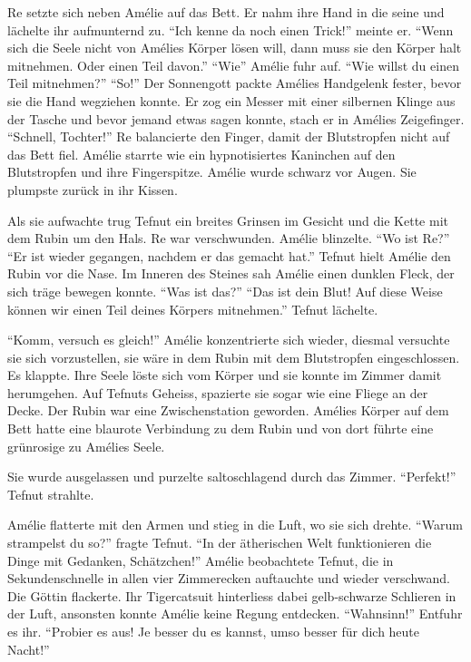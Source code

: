 \documentclass[11pt,titlepage,a5paper]{book}
\begin{document}
Re setzte sich neben Amélie auf das Bett. Er nahm ihre Hand in die seine und lächelte ihr aufmunternd zu. "`Ich kenne da noch einen Trick!"' meinte er. "`Wenn sich die Seele nicht von Amélies Körper lösen will, dann muss sie den Körper halt mitnehmen. Oder einen Teil davon."' "`Wie"' Amélie fuhr auf. "`Wie willst du einen Teil mitnehmen?"' "`So!"' Der Sonnengott packte Amélies Handgelenk fester, bevor sie die Hand wegziehen konnte. Er zog ein Messer mit einer silbernen Klinge aus der Tasche und bevor jemand etwas sagen konnte, stach er in Amélies Zeigefinger. "`Schnell, Tochter!"' Re balancierte den Finger, damit der Blutstropfen nicht auf das Bett fiel. Amélie starrte wie ein hypnotisiertes Kaninchen auf den Blutstropfen und ihre Fingerspitze. Amélie wurde schwarz vor Augen. Sie plumpste zurück in ihr Kissen. 

Als sie aufwachte trug Tefnut ein breites Grinsen im Gesicht und die Kette mit dem Rubin um den Hals. Re war verschwunden. Amélie blinzelte. "`Wo ist Re?"' "`Er ist wieder gegangen, nachdem er das gemacht hat."' Tefnut hielt Amélie den Rubin vor die Nase. Im Inneren des Steines sah Amélie einen dunklen Fleck, der sich träge bewegen konnte. "`Was ist das?"' "`Das ist dein Blut! Auf diese Weise können wir einen Teil deines Körpers mitnehmen."' Tefnut lächelte.

"`Komm, versuch es gleich!"' Amélie konzentrierte sich wieder, diesmal versuchte sie sich vorzustellen, sie wäre in dem Rubin mit dem Blutstropfen eingeschlossen. Es klappte. Ihre Seele löste sich vom Körper und sie konnte im Zimmer damit herumgehen. Auf Tefnuts Geheiss, spazierte sie sogar wie eine Fliege an der Decke. Der Rubin war eine Zwischenstation geworden. Amélies Körper auf dem Bett hatte eine blaurote Verbindung zu dem Rubin und von dort führte eine grünrosige zu Amélies Seele.

Sie wurde ausgelassen und purzelte saltoschlagend durch das Zimmer. "`Perfekt!"' Tefnut strahlte. 

Amélie flatterte mit den Armen und stieg in die Luft, wo sie sich drehte. "`Warum strampelst du so?"' fragte Tefnut. "`In der ätherischen Welt funktionieren die Dinge mit Gedanken, Schätzchen!"' Amélie beobachtete Tefnut, die in Sekundenschnelle in allen vier Zimmerecken auftauchte und wieder verschwand. Die Göttin flackerte. Ihr Tigercatsuit hinterliess dabei gelb-schwarze Schlieren in der Luft, ansonsten konnte Amélie keine Regung entdecken. "`Wahnsinn!"' Entfuhr es ihr. "`Probier es aus! Je besser du es kannst, umso besser für dich heute Nacht!"'
\end{document}
